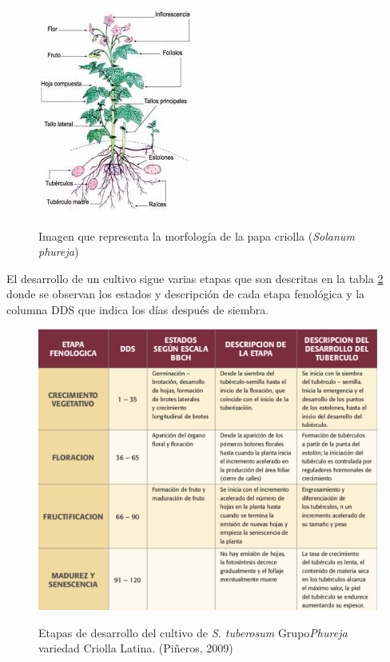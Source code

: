 \begin{figure}[h!]
	\caption{Imagen que representa la morfología de la papa criolla (\textit{Solanum phureja})}
	\centering
	\includegraphics[scale=0.7]{planta.jpeg}
	\label{fig:planta}
\end{figure}

El desarrollo de un cultivo sigue varias etapas que son descritas en la tabla \ref{fig:cultivo} donde se observan los estados y descripción de cada etapa fenológica y la columna DDS que indica los días después de siembra.\\

\begin{figure}[h!]
	\caption{Etapas de desarrollo del cultivo de \textit{S. tuberosum} Grupo\textit{Phureja} variedad Criolla Latina. (Piñeros, 2009)}
	\centering
	\includegraphics[scale=0.8]{papas.png}
	\label{fig:cultivo}
\end{figure}

